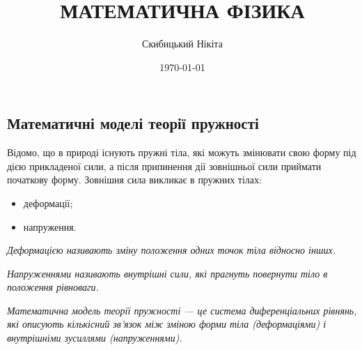 

\title{{\Huge МАТЕМАТИЧНА ФІЗИКА}}
\author{Скибицький Нікіта}
\date{\today}





\tableofcontents

\setcounter{section}{3}
\setcounter{subsection}{1}
\setcounter{subsubsection}{4}
\setcounter{theorem}{15}
\setcounter{equation}{57}

\subsection{Математичні моделі теорії пружності}

Відомо, що в природі існують пружні тіла, які можуть змінювати свою форму під дією прикладеної сили, а після припинення дії зовнішньої сили приймати початкову форму. Зовнішня сила викликає в пружних тілах:
\begin{itemize}
	\item деформації;
	\item напруження.
\end{itemize}

\begin{definition}[деформації]
	\it{Деформацією} називають зміну положення одних точок тіла відносно інших.
\end{definition}

\begin{definition}[напружень]
	\it{Напруженнями} називають внутрішні сили, які прагнуть повернути тіло в положення рівноваги.
\end{definition}

\begin{definition}
	\it{Математична модель теорії пружності} --- це система диференціальних рівнянь, які описують кількісний зв'язок між зміною форми тіла (деформаціями) і внутрішніми зусиллями (напруженнями). 
\end{definition}

